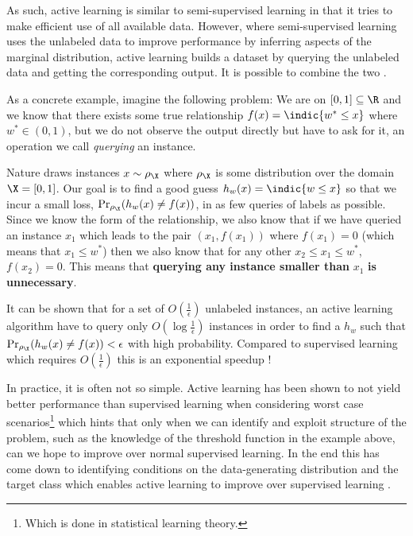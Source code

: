As such, active learning is similar to semi-supervised learning
\cite{chapelle09_semi_super_learn_o} in that it tries to make efficient use of all
available data. However, where semi-supervised learning uses the unlabeled data
to improve performance by inferring aspects of the marginal distribution, active
learning builds a dataset by querying the unlabeled data and getting the
corresponding output. It is possible to combine the two \cite{zhu03_combin}.

As a concrete example, imagine the following problem: We are on \([0,
1] \subseteq \R\) and we know that there exists some true relationship
\(f(x) = \indic{w^{\ast} \leq x}\) where \(w^{\ast} \in (0, 1)\),
but we do not observe the output directly but have to ask for it, an operation we
call \emph{querying} an instance. 

Nature draws instances \(x \sim \rho_{\X}\) where \(\rho_{\X}\) is some
distribution over the domain \(\X = [0, 1]\). Our goal is to find a good guess
\(h_{w}(x) = \indic{w \leq x}\) so that we incur a small loss,
\(\Pr_{\rho_{\X}}(h_{w}(x) \neq f(x))\), in as few queries of labels as
possible. Since we know the form of the relationship, we also know that if we
have queried an instance \(x_{1}\) which leads to the pair \((x_{1}, f(x_{1}))\)
where \(f(x_{1}) = 0\) (which means that \(x_{1} \leq w^{\ast}\)) then we also
know that for any other \(x_{2} \leq x_{1} \leq w^{\ast}\), \(f(x_{2}) = 0\).
This means that \textbf{querying any instance smaller than} \(x_{1}\) \textbf{is unnecessary}.

It can be shown that for a set of \(O(\frac{1}{\epsilon})\) unlabeled
instances, an active learning algorithm have to query only \(O(\log
\frac{1}{\epsilon})\) instances in order to find a \(h_{w}\) such that \(\Pr_{\rho_{\X}}(h_{w}(x)
\neq f(x)) < \epsilon\) with high probability. Compared to supervised
learning which requires \(O(\frac{1}{\epsilon})\) this is an exponential
speedup \cite{dasgupta06_coars,dasgupta05_analy}!

In practice, it is often not so simple. Active learning has been shown to not
yield better performance than supervised learning when considering worst case
scenarios\footnote{Which is done in statistical learning theory.} which hints
that only when we can identify and exploit structure of the problem, such as the
knowledge of the threshold function in the example above, can we hope to improve
over normal supervised learning. In the end this has come down to identifying
conditions on the data-generating distribution and the target class which
enables active learning to improve over supervised learning
\cite{balkan15_activ_learn_moder_learn_theor}.

